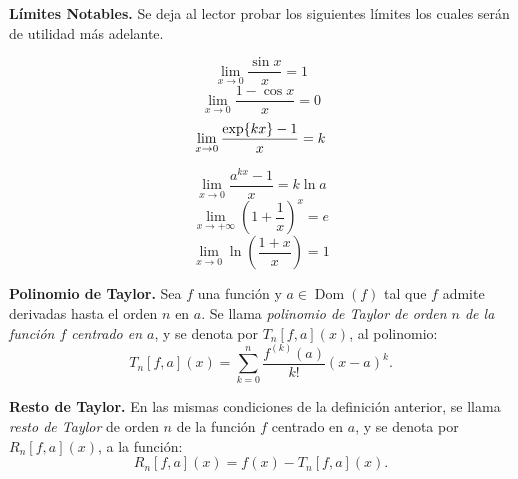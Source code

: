 \begin{obs}{\textbf{Límites Notables.}}
    \label{obs:LimitesNotables}
   Se deja al lector probar los siguientes límites  los cuales ser\'an de utilidad m\'as adelante. 

    \begin{minipage}{0.45\textwidth}
        \begin{equation}
            \lim_{x\to 0}{\frac{\sin{x}}{x}}=1
            \label{limNot:sen(x)/x}
        \end{equation}
        \begin{equation}
            \lim_{x\to 0}{\frac{1-\cos{x}}{x}}=0
            \label{limNot:(1-cos(x))/x}
        \end{equation}
        \begin{equation}
            \lim_{x\to 0}{\frac{\exp{kx}-1}{x}}=k
            \label{limNot:(e^{kx}-1)/(x)}
        \end{equation}
    \end{minipage}
    \hfill
    \begin{minipage}{0.45\textwidth}
        \begin{equation}
            \lim_{x\to 0}{\frac{a^{kx}-1}{x}}=k\ln{a}
            \label{limNot:(a^(kx)-1)/(x)}
        \end{equation}
        \begin{equation}
            \lim_{x\to +\infty}{\left( 1+\frac{1}{x} \right)^x}=e
            \label{limNot:e}
        \end{equation}
        \begin{equation}
            \lim_{x\to 0}{\ln{\left(\frac{1+x}{x} \right)}}=1
            \label{limNot:ln(1+x/x)}
        \end{equation}
    \end{minipage}
\end{obs}


\begin{definition}\label{def:PolTaylor}{\textbf{Polinomio de Taylor.}}
Sea $f$ una función y $a \in \operatorname{Dom}(f)$ tal que $f$ admite derivadas hasta el orden $n$ en $a$. Se llama \textit{polinomio de Taylor de orden $n$ de la función $f$ centrado en $a$}, y se denota por $T_n[f,a](x)$, al polinomio:
\begin{equation*} 
T_n[f,a](x) = \sum_{k=0}^{n} \frac{f^{(k)}(a)}{k!}(x-a)^k. 
\end{equation*}
\end{definition}

\begin{definition}{\textbf{Resto de Taylor.}}
En las mismas condiciones de la definición anterior, se llama \textit{resto de Taylor} de orden $n$ de la función $f$ centrado en $a$, y se denota por $R_n[f,a](x)$, a la función:
\begin{equation*} 
R_n[f,a](x) = f(x) - T_n[f,a](x). 
\end{equation*} 
\end{definition}


